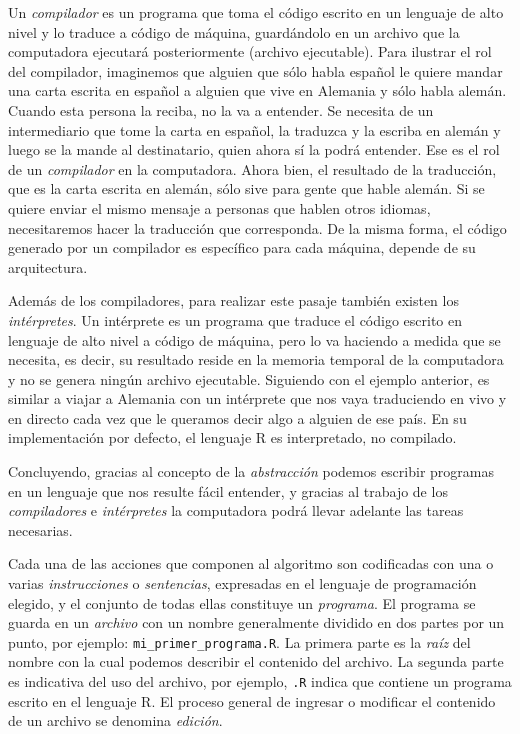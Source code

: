 \documentclass[
]{book}
\begin{document}
Un \emph{compilador} es un programa que toma el código escrito en un lenguaje de alto nivel y lo traduce a código de máquina, guardándolo en un archivo que la computadora ejecutará posteriormente (archivo ejecutable). Para ilustrar el rol del compilador, imaginemos que alguien que sólo habla español le quiere mandar una carta escrita en español a alguien que vive en Alemania y sólo habla alemán. Cuando esta persona la reciba, no la va a entender. Se necesita de un intermediario que tome la carta en español, la traduzca y la escriba en alemán y luego se la mande al destinatario, quien ahora sí la podrá entender. Ese es el rol de un \emph{compilador} en la computadora. Ahora bien, el resultado de la traducción, que es la carta escrita en alemán, sólo sive para gente que hable alemán. Si se quiere enviar el mismo mensaje a personas que hablen otros idiomas, necesitaremos hacer la traducción que corresponda. De la misma forma, el código generado por un compilador es específico para cada máquina, depende de su arquitectura.

Además de los compiladores, para realizar este pasaje también existen los \emph{intérpretes}. Un intérprete es un programa que traduce el código escrito en lenguaje de alto nivel a código de máquina, pero lo va haciendo a medida que se necesita, es decir, su resultado reside en la memoria temporal de la computadora y no se genera ningún archivo ejecutable. Siguiendo con el ejemplo anterior, es similar a viajar a Alemania con un intérprete que nos vaya traduciendo en vivo y en directo cada vez que le queramos decir algo a alguien de ese país. En su implementación por defecto, el lenguaje R es interpretado, no compilado.

Concluyendo, gracias al concepto de la \emph{abstracción} podemos escribir programas en un lenguaje que nos resulte fácil entender, y gracias al trabajo de los \emph{compiladores} e \emph{intérpretes} la computadora podrá llevar adelante las tareas necesarias.

Cada una de las acciones que componen al algoritmo son codificadas con una o varias \emph{instrucciones} o \emph{sentencias}, expresadas en el lenguaje de programación elegido, y el conjunto de todas ellas constituye un \emph{programa}. El programa se guarda en un \emph{archivo} con un nombre generalmente dividido en dos partes por un punto, por ejemplo: \texttt{mi\_primer\_programa.R}. La primera parte es la \emph{raíz} del nombre con la cual podemos describir el contenido del archivo. La segunda parte es indicativa del uso del archivo, por ejemplo, \texttt{.R} indica que contiene un programa escrito en el lenguaje R. El proceso general de ingresar o modificar el contenido de un archivo se denomina \emph{edición}.
\end{document}
